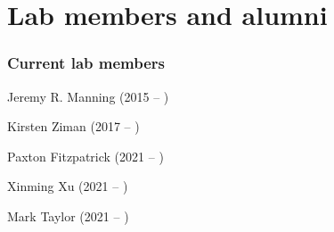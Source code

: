 \documentclass{tufte-book} %
\begin{document}
\chapter{Lab members and alumni}\label{ch:members}
\begin{fullwidth}
\subsection{Current lab members}\label{sec:curr_members}
\bigskip

\enskip Jeremy R. Manning (2015 -- )


\begin{multicols}{2}\raggedcolumns
\begin{list}{\quad}{}
\item Kirsten Ziman (2017 -- )
\item Paxton Fitzpatrick (2021 -- )
\item Xinming Xu (2021 -- )
\end{list}
\end{multicols}


\begin{multicols}{2}\raggedcolumns
\begin{list}{\quad}{}
\item Mark Taylor (2021 -- )
\end{list}
\end{multicols}



\end{fullwidth}
\end{document}
